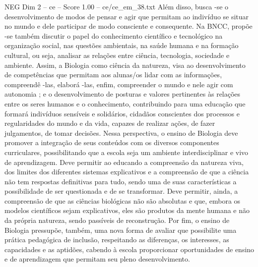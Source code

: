 \begin{textsample}{NEG Dim 2 – ce – Score 1.00 – ce/ce\_em\_38.txt}
Além disso, busca -se o desenvolvimento de modos de pensar e agir que permitam ao indivíduo se situar no mundo e dele participar de modo consciente e consequente.
Na BNCC, propõe -se também discutir o papel do conhecimento científico e tecnológico na organização social, nas questões ambientais, na saúde humana e na formação cultural, ou seja, analisar as relações entre ciência, tecnologia, sociedade e ambiente.
Assim, a Biologia como ciência da natureza, visa ao desenvolvimento de competências que permitam aos alunas/os lidar com as informações, compreendê -las, elaborá -las, enfim, compreender o mundo e nele agir com autonomia ; e o desenvolvimento de posturas e valores pertinentes às relações entre os seres humanos e o conhecimento, contribuindo para uma educação que formará indivíduos sensíveis e solidários, cidadãos conscientes dos processos e regularidades do mundo e da vida, capazes de realizar ações, de fazer julgamentos, de tomar decisões.
Nessa perspectiva, o ensino de Biologia deve promover a integração de seus conteúdos com os diversos componentes curriculares, possibilitando que a escola seja um ambiente interdisciplinar e vivo de aprendizagem.
Deve permitir ao educando a compreensão da natureza viva, dos limites dos diferentes sistemas explicativos e a compreensão de que a ciência não tem respostas definitivas para tudo, sendo uma de suas características a possibilidade de ser questionada e de se transformar.
Deve permitir, ainda, a compreensão de que as ciências biológicas não são absolutas e que, embora os modelos científicos sejam explicativos, eles são produtos da mente humana e não da própria natureza, sendo passíveis de reconstrução.
Por fim, o ensino de Biologia pressupõe, também, uma nova forma de avaliar que possibilite uma prática pedagógica de inclusão, respeitando as diferenças, os interesses, as capacidades e as aptidões, cabendo à escola proporcionar oportunidades de ensino e de aprendizagem que permitam seu pleno desenvolvimento.

\end{textsample}
